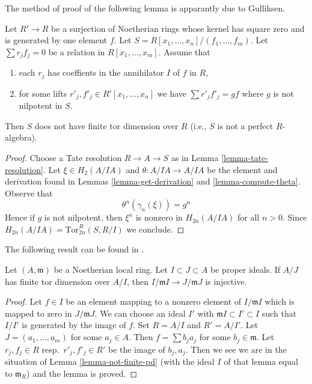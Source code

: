\noindent
The method of proof of the following lemma is apparantly due to Gulliksen.

\begin{lemma}
\label{lemma-not-finite-pd}
Let $R' \to R$ be a surjection of Noetherian rings whose kernel has square
zero and is generated by one element $f$. Let
$S = R[x_1, \ldots, x_n]/(f_1, \ldots, f_m)$.
Let $\sum r_j f_j = 0$ be a relation in $R[x_1, \ldots, x_m]$.
Assume that
\begin{enumerate}
\item each $r_j$ has coeffients in the annihilator $I$ of $f$ in $R$,
\item for some lifts $r'_j, f'_j \in R'[x_1, \ldots, x_n]$ we have
$\sum r'_j f'_j = gf$ where $g$ is not nilpotent in $S$.
\end{enumerate}
Then $S$ does not have finite tor dimension over $R$ (i.e., $S$ is not
a perfect $R$-algebra).
\end{lemma}

\begin{proof}
Choose a Tate resolution $R \to A \to S$ as in
Lemma \ref{lemma-tate-resolution}.
Let $\xi \in H_2(A/IA)$ and $\theta : A/IA \to A/IA$ be the element
and derivation found in Lemmas \ref{lemma-get-derivation} and
\ref{lemma-compute-theta}.
Observe that
$$
\theta^n(\gamma_n(\xi)) = g^n
$$
Hence if $g$ is not nilpotent, then $\xi^n$ is nonzero in
$H_{2n}(A/IA)$ for all $n > 0$. Since
$H_{2n}(A/IA) = \text{Tor}^R_{2n}(S, R/I)$ we conclude.
\end{proof}

\noindent
The following result can be found in \cite{Rodicio}.

\begin{lemma}
\label{lemma-injective}
Let $(A, \mathfrak m)$ be a Noetherian local ring. Let
$I \subset J \subset A$ be proper ideals. If $A/J$ has finite
tor dimension over $A/I$, then $I/\mathfrak m I \to J/\mathfrak m J$
is injective.
\end{lemma}

\begin{proof}
Let $f \in I$ be an element mapping to a nonzero element of $I/\mathfrak m I$
which is mapped to zero in $J/\mathfrak mJ$. We can choose an ideal $I'$
with $\mathfrak mI \subset I' \subset I$ such that $I/I'$ is generated by
the image of $f$. Set $R = A/I$ and $R' = A/I'$. Let $J = (a_1, \ldots, a_m)$
for some $a_j \in A$. Then $f = \sum b_j a_j$ for some $b_j \in \mathfrak m$.
Let $r_j, f_j \in R$ resp.\ $r'_j, f'_j \in R'$ be the image of $b_j, a_j$.
Then we see we are
in the situation of Lemma \ref{lemma-not-finite-pd}
(with the ideal $I$ of that lemma equal to $\mathfrak m_R$)
and the lemma is proved.
\end{proof}

